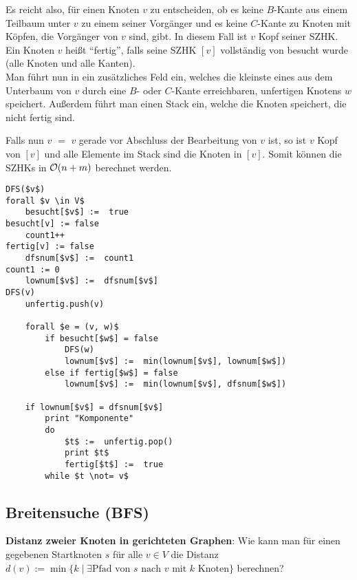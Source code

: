 \linie

Es reicht also, für einen Knoten $v$ zu entscheiden, ob es keine $B$-Kante
aus einem Teilbaum unter $v$ zu einem seiner Vorgänger und es keine $C$-Kante
zu Knoten mit Köpfen, die Vorgänger von $v$ sind, gibt.
In diesem Fall ist $v$ Kopf seiner SZHK. \\
Ein Knoten $v$ heißt "`fertig"', falls seine SZHK $[v]$ vollständig von
 besucht wurde (alle Knoten und alle Kanten). \\
Man führt nun in  ein zusätzliches Feld  ein, welches
die kleinste  eines aus dem Unterbaum von $v$ durch eine
$B$- oder $C$-Kante erreichbaren, unfertigen Knotens $w$ speichert.
Außerdem führt man einen Stack  ein, welche die Knoten
speichert, die nicht fertig sind.

Falls nun \code{dfsnum[}$v$\code{]} $=$ \code{lownum[}$v$\code{]} gerade
vor Abschluss der Bearbeitung von $v$\code{)} ist,
so ist $v$ Kopf von $[v]$ und alle Elemente im Stack  sind
die Knoten in $[v]$.
Somit können die SZHKs in $\mathcal{O}(n + m)$ berechnet werden.

\begin{lstlisting}
DFS($v$)                                                                  forall $v \in V$
    besucht[$v$] :=  true                                                      besucht[v] := false
    count1++                                                               fertig[v] := false
    dfsnum[$v$] :=  count1                                                     count1 := 0
    lownum[$v$] :=  dfsnum[$v$]                                                   DFS(v)
    unfertig.push(v)

    forall $e = (v, w)$
        if besucht[$w$] = false
            DFS(w)
            lownum[$v$] :=  min(lownum[$v$], lownum[$w$])
        else if fertig[$w$] = false
            lownum[$v$] :=  min(lownum[$v$], dfsnum[$w$])

    if lownum[$v$] = dfsnum[$v$]
        print "Komponente"
        do
            $t$ :=  unfertig.pop()
            print $t$
            fertig[$t$] :=  true
        while $t \not= v$
\end{lstlisting}

\subsection{%
    Breitensuche (BFS)%
}

\textbf{Distanz zweier Knoten in gerichteten Graphen}:
Wie kann man für einen gegebenen Startknoten $s$ für alle $v \in V$ die
Distanz $d(v) := \min\{k \;|\; \exists\text{Pfad von } s \text{ nach } v
\text{ mit } k \text{ Knoten}\}$ berechnen?

